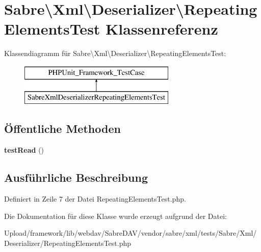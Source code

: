 \hypertarget{class_sabre_1_1_xml_1_1_deserializer_1_1_repeating_elements_test}{}\section{Sabre\textbackslash{}Xml\textbackslash{}Deserializer\textbackslash{}Repeating\+Elements\+Test Klassenreferenz}
\label{class_sabre_1_1_xml_1_1_deserializer_1_1_repeating_elements_test}
Klassendiagramm für Sabre\textbackslash{}Xml\textbackslash{}Deserializer\textbackslash{}Repeating\+Elements\+Test\+:\begin{figure}[H]
\begin{center}
\leavevmode
\includegraphics[height=2.000000cm]{class_sabre_1_1_xml_1_1_deserializer_1_1_repeating_elements_test}
\end{center}
\end{figure}
\subsection*{Öffentliche Methoden}
\begin{DoxyCompactItemize}
\item 
\mbox{\label{class_sabre_1_1_xml_1_1_deserializer_1_1_repeating_elements_test_a089b666c38fa5ffef91b9d04dc2065f9}} 
{\bfseries test\+Read} ()
\end{DoxyCompactItemize}


\subsection{Ausführliche Beschreibung}


Definiert in Zeile 7 der Datei Repeating\+Elements\+Test.\+php.



Die Dokumentation für diese Klasse wurde erzeugt aufgrund der Datei\+:\begin{DoxyCompactItemize}
\item 
Upload/framework/lib/webdav/\+Sabre\+D\+A\+V/vendor/sabre/xml/tests/\+Sabre/\+Xml/\+Deserializer/Repeating\+Elements\+Test.\+php\end{DoxyCompactItemize}

